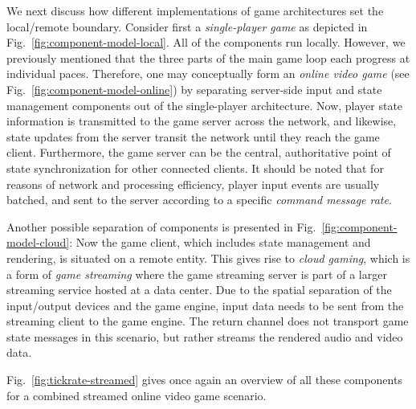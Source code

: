 We next discuss how different implementations of game architectures  
set the local/remote boundary. Consider first a \textit{single-player game}
as depicted in Fig.~\ref{fig:component-model-local}. All of the 
components run locally. However, we previously mentioned that the 
three parts of the main game loop each progress at individual paces. 
Therefore, one may conceptually form an \textit{online video game} (see 
Fig.~\ref{fig:component-model-online}) by separating server-side 
input and state management components out of the single-player 
architecture. Now, player state information is transmitted to the 
game server across the network, and likewise, state updates from 
the server transit the network until they reach the game client.
Furthermore, the game server can be the central, authoritative 
point of state synchronization for other connected clients.
It should be noted that for reasons of network and processing efficiency, 
player input events are usually batched, and sent to the server according 
to a specific \textit{command message rate}.


Another possible separation of components is presented in 
Fig.~\ref{fig:component-model-cloud}: Now the game client, which includes 
state management and rendering, is situated on a remote entity. This gives rise to 
\textit{cloud gaming}, which is a form of \textit{game streaming} 
where the game streaming server is part of a larger streaming service 
hosted at a data center. Due to the spatial separation of the 
input/output devices and the game engine, input data needs to be 
sent from the streaming client to the game engine. The return channel 
does not transport game state messages in this scenario, but rather streams the 
rendered audio and video data.

Fig.~\ref{fig:tickrate-streamed} gives once again an overview of all these components for a combined streamed online video game scenario.

